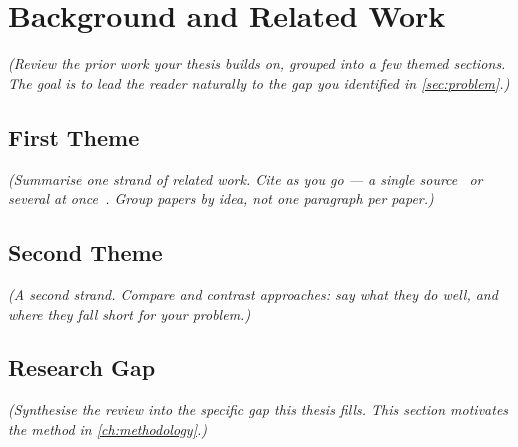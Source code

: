 \chapter{Background and Related Work}
\label{ch:background}

\emph{(Review the prior work your thesis builds on, grouped into a few themed
sections. The goal is to lead the reader naturally to the gap you identified in
\cref{sec:problem}.)}

\section{First Theme}
\label{sec:rw-first}

\emph{(Summarise one strand of related work. Cite as you go --- a single
source~\cite{smith2024example} or several at
once~\cite{smith2024example,tanaka2023example}. Group papers by idea, not one
paragraph per paper.)}

\section{Second Theme}
\label{sec:rw-second}

\emph{(A second strand. Compare and contrast approaches: say what they do well,
and where they fall short for your problem.)}

\section{Research Gap}
\label{sec:rw-gap}

\emph{(Synthesise the review into the specific gap this thesis fills. This
section motivates the method in \cref{ch:methodology}.)}
